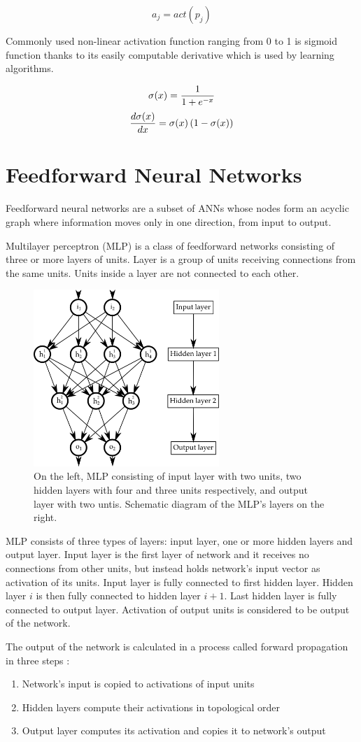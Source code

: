 \documentclass[12pt,oneside]{fithesis2}
\begin{document}
$$a_{j} = act\left(p_j\right)$$
\par
Commonly used non-linear activation function ranging from 0 to 1 is sigmoid function thanks to its easily computable derivative which is used by learning algorithms.

$$\sigma(x) = {1 \over {1 + e^{-x}}}$$
$${{d\sigma(x)} \over dx} = \sigma(x)  \left(1 - \sigma(x)\right)$$

\section{Feedforward Neural Networks}
Feedforward neural networks are a subset of ANNs whose nodes form an acyclic graph where information moves only in one direction, from input to output. \par
Multilayer perceptron (MLP) is a class of feedforward networks consisting of three or more layers of units. Layer is a group of units receiving connections from the same units. Units inside a layer are not connected to each other. \par
	\begin{figure}[ht]
		\centering
		\includegraphics[width=265px]{mlp.png}
		\caption{On the left, MLP consisting of input layer with two units, two hidden layers with four and three units respectively, and output layer with two untis. Schematic diagram of the MLP's layers on the right.}
	\end{figure}
MLP consists of three types of layers: input layer, one or more hidden layers and output layer. Input layer is the first layer of network and it receives no connections from other units, but instead holds network's input vector as activation of its units. Input layer is fully connected to first hidden layer. Hidden layer $i$ is then fully connected to hidden layer $i + 1$. Last hidden layer is fully connected to output layer. Activation of output units is considered to be output of the network. \par
The output of the network is calculated in a process called forward propagation in three steps :
\begin{enumerate}
	\item Network's input is copied to activations of input units
	\item Hidden layers compute their activations in topological order
	\item Output layer computes its activation and copies it to network's output
\end{enumerate}
\end{document}
